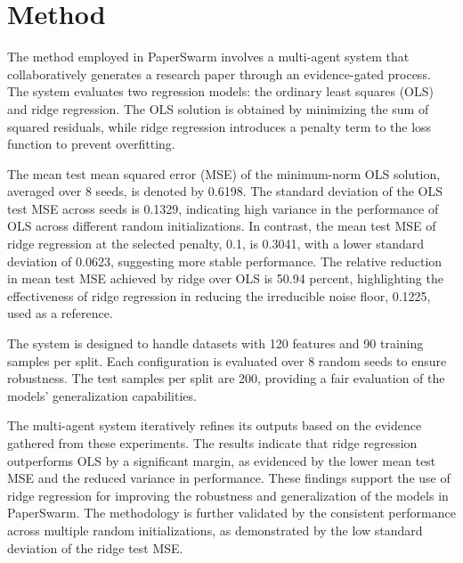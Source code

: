 \section{Method}

The method employed in PaperSwarm involves a multi-agent system that collaboratively generates a research paper through an evidence-gated process. The system evaluates two regression models: the ordinary least squares (OLS) and ridge regression. The OLS solution is obtained by minimizing the sum of squared residuals, while ridge regression introduces a penalty term to the loss function to prevent overfitting.

The mean test mean squared error (MSE) of the minimum-norm OLS solution, averaged over 8 seeds, is denoted by 0.6198. The standard deviation of the OLS test MSE across seeds is 0.1329, indicating high variance in the performance of OLS across different random initializations. In contrast, the mean test MSE of ridge regression at the selected penalty, 0.1, is 0.3041, with a lower standard deviation of 0.0623, suggesting more stable performance. The relative reduction in mean test MSE achieved by ridge over OLS is 50.94 percent, highlighting the effectiveness of ridge regression in reducing the irreducible noise floor, 0.1225, used as a reference.

The system is designed to handle datasets with 120 features and 90 training samples per split. Each configuration is evaluated over 8 random seeds to ensure robustness. The test samples per split are 200, providing a fair evaluation of the models' generalization capabilities.

The multi-agent system iteratively refines its outputs based on the evidence gathered from these experiments. The results indicate that ridge regression outperforms OLS by a significant margin, as evidenced by the lower mean test MSE and the reduced variance in performance. These findings support the use of ridge regression for improving the robustness and generalization of the models in PaperSwarm. The methodology is further validated by the consistent performance across multiple random initializations, as demonstrated by the low standard deviation of the ridge test MSE.
